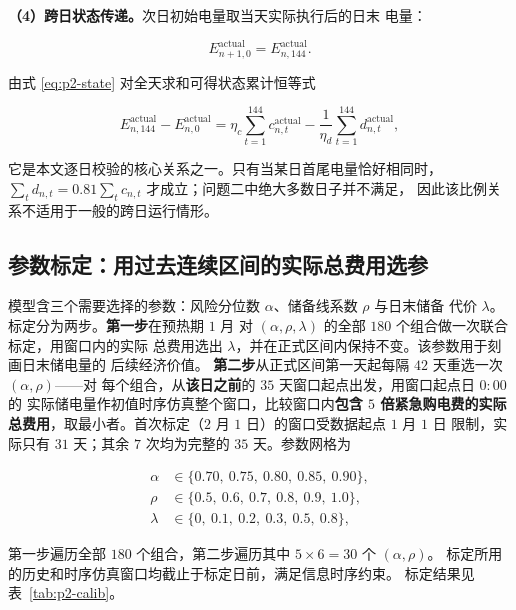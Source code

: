 \documentclass[withoutpreface,bwprint]{cumcmthesis}
\begin{document}
\textbf{（4）跨日状态传递。}次日初始电量取当天实际执行后的日末
电量：

\begin{equation}
  E_{n+1,0}^{\mathrm{actual}}=E_{n,144}^{\mathrm{actual}} .
  \label{eq:p2-carry}
\end{equation}

由式 \eqref{eq:p2-state} 对全天求和可得状态累计恒等式

\begin{equation}
  E_{n,144}^{\mathrm{actual}}-E_{n,0}^{\mathrm{actual}}
  =\eta_c\sum_{t=1}^{144}c_{n,t}^{\mathrm{actual}}
  -\frac{1}{\eta_d}\sum_{t=1}^{144}d_{n,t}^{\mathrm{actual}} ,
  \label{eq:p2-accum}
\end{equation}

它是本文逐日校验的核心关系之一。只有当某日首尾电量恰好相同时，
$\sum_t d_{n,t}=0.81\sum_t c_{n,t}$ 才成立；问题二中绝大多数日子并不满足，
因此该比例关系不适用于一般的跨日运行情形。

\subsection{参数标定：用过去连续区间的实际总费用选参}
\label{sec:p2-calib}

模型含三个需要选择的参数：风险分位数 $\alpha$、储备线系数 $\rho$ 与日末储备
代价 $\lambda$。标定分为两步。\textbf{第一步}在预热期 $1$ 月
对 $(\alpha,\rho,\lambda)$ 的全部 $180$ 个组合做一次联合标定，用窗口内的实际
总费用选出 $\lambda$，并在正式区间内保持不变。该参数用于刻画日末储电量的
后续经济价值。
\textbf{第二步}从正式区间第一天起每隔 $42$ 天重选一次 $(\alpha,\rho)$——对
每个组合，从\textbf{该日之前}的 $35$ 天窗口起点出发，用窗口起点日 $0{:}00$ 的
实际储电量作初值时序仿真整个窗口，比较窗口内\textbf{包含 $5$ 倍紧急购电费的实际
总费用}，取最小者。首次标定（$2$ 月 $1$ 日）的窗口受数据起点 $1$ 月 $1$ 日
限制，实际只有 $31$ 天；其余 $7$ 次均为完整的 $35$ 天。参数网格为

\begin{equation}
  \begin{aligned}
  \alpha&\in\{0.70,\ 0.75,\ 0.80,\ 0.85,\ 0.90\},\\
  \rho&\in\{0.5,\ 0.6,\ 0.7,\ 0.8,\ 0.9,\ 1.0\},\\
  \lambda&\in\{0,\ 0.1,\ 0.2,\ 0.3,\ 0.5,\ 0.8\},
  \end{aligned}
  \label{eq:p2-grid}
\end{equation}

第一步遍历全部 $180$ 个组合，第二步遍历其中 $5\times6=30$ 个 $(\alpha,\rho)$。
标定所用的历史和时序仿真窗口均截止于标定日前，满足信息时序约束。
标定结果见表~\ref{tab:p2-calib}。
\end{document}

